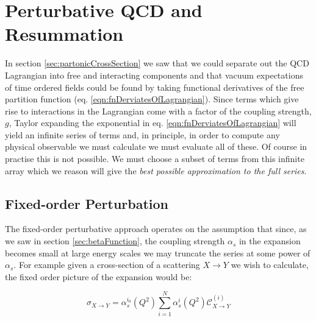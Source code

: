 \section{Perturbative QCD and Resummation}
	\label{sec:pqcdAndResum}

	In section \ref{sec:partonicCrossSection} we saw that we could separate out the QCD Lagrangian into
	free and interacting components and that vacuum expectations of time ordered fields could be found by
	taking functional derivatives of the free partition function (eq. \eqref{eqn:fnDerviatesOfLagrangian}).
	Since terms which give rise to interactions in the Lagrangian come with a factor of the coupling strength,
	$g$, Taylor expanding the exponential in eq. \eqref{eqn:fnDerviatesOfLagrangian} will yield an infinite
	series of terms and, in principle, in order to compute any physical observable we must calculate we must
	evaluate all of these.  Of course in practise this is not possible.  We must choose a subset of terms from
	this infinite array which we reason will give the \emph{best possible approximation to the full series}.

	\subsection{Fixed-order Perturbation}

		The fixed-order perturbative approach operates on the assumption that since, as we saw in section \ref{sec:betaFunction},
		the coupling strength $\alpha_s$ in the expansion becomes small at large energy scales we may truncate the series at some
		power of $\alpha_s$.  For example given a cross-section of a scattering $X\rightarrow Y$ we wish to calculate, the fixed
		order picture of the expansion would be:

		\begin{equation}
			\sigma_{X\rightarrow Y} = \alpha_s^{i_0}(Q^2)\sum_{i=1}^N\alpha_s^{i}(Q^2)\mathcal{C}^{(i)}_{X\rightarrow Y}
		\end{equation}

